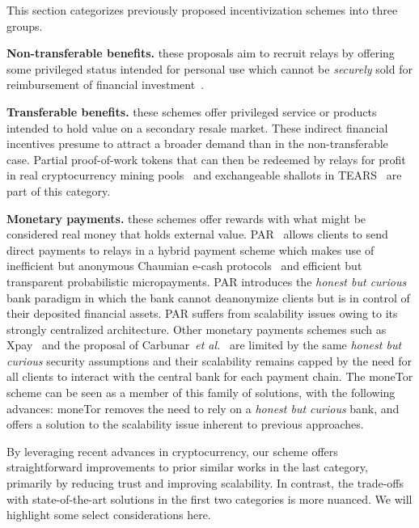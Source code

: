This section categorizes previously proposed incentivization schemes into three groups.

\medskip\noindent\textbf{Non-transferable benefits.} these proposals aim to recruit relays by offering some privileged status intended for personal use which cannot be \emph{securely} sold for reimbursement of financial investment~\cite{dingledine2010building,jansen2010recruiting, jansen2013lira}.

\medskip\noindent\textbf{Transferable benefits.} these schemes offer privileged service or products intended to hold value on a secondary resale market.
These indirect financial incentives presume to attract a broader demand than in the non-transferable case.
Partial proof-of-work tokens that can then be redeemed by relays for profit in real cryptocurrency mining pools~\cite{biryukov2015proof} and exchangeable shallots in TEARS~\cite{jansen2014onions} are part of this category.

\medskip\noindent\textbf{Monetary payments.} these schemes offer rewards with what might be considered real money that holds external value.
PAR~\cite{androulaki2008payment} allows clients to send direct payments to relays in a hybrid payment scheme which makes use of inefficient but anonymous Chaumian e-cash protocols~\cite{chaum1988untraceable} and efficient but transparent probabilistic micropayments.
PAR introduces the \emph{honest but curious} bank paradigm in which the bank cannot deanonymize clients but is in control of their deposited financial assets.
PAR suffers from scalability issues owing to its strongly centralized architecture.
Other monetary payments schemes such as Xpay~\cite{chen2009xpay} and the proposal of Carbunar~\textit{et al.}~\cite{carbunar2012tipping} are limited by the same \emph{honest but curious} security assumptions and their scalability remains capped by the need for all clients to interact with the central bank for each payment chain.
The moneTor scheme can be seen as a member of this family of solutions, with the following advances: moneTor removes the need to rely on a \textit{honest but curious} bank, and offers a solution to the scalability issue inherent to previous approaches.

By leveraging recent advances in cryptocurrency, our scheme offers straightforward improvements to prior similar works in the last category, primarily by reducing trust and improving scalability.
In contrast, the trade-offs with state-of-the-art solutions in the first two categories is more nuanced.
We will highlight some select considerations here.

